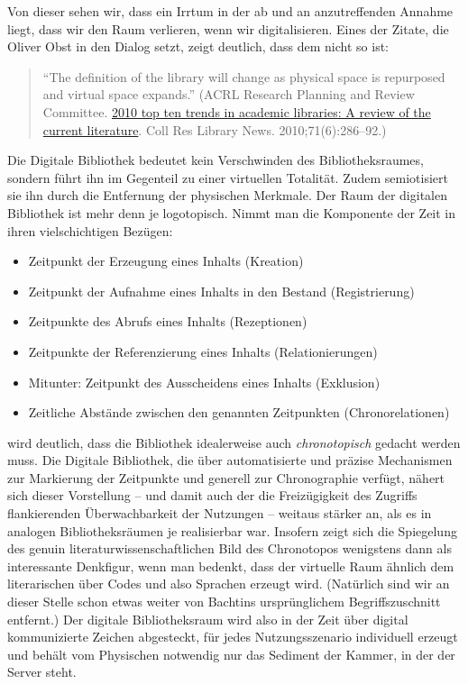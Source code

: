 \documentclass[output=paper]{langscibook}
\begin{document}
Von dieser sehen wir, dass ein Irrtum in der ab und an anzutreffenden
Annahme liegt, dass wir den Raum verlieren, wenn wir digitalisieren.
Eines der Zitate, die Oliver Obst in den Dialog setzt, zeigt deutlich,
dass dem nicht so ist:

\begin{quote}
\enquote{The definition of the library will change as physical space is
repurposed and virtual space expands.} (ACRL Research Planning and
Review Committee. \href{http://crln.acrl.org/content/71/6/286.full}{2010
top ten trends in academic libraries: A review of the current
literature}. Coll Res Library News. 2010;71(6):286--92.)
\end{quote}

\noindent Die Digitale Bibliothek bedeutet kein Verschwinden des
Bibliotheksraumes, sondern führt ihn im Gegenteil zu einer virtuellen
Totalität. Zudem semiotisiert sie ihn durch die Entfernung der
physischen Merkmale. Der Raum der digitalen Bibliothek ist mehr denn je
logotopisch. Nimmt man die Komponente der Zeit in ihren vielschichtigen
Bezügen:

\begin{itemize}
\item
  Zeitpunkt der Erzeugung eines Inhalts (Kreation)
\item
  Zeitpunkt der Aufnahme eines Inhalts in den Bestand (Registrierung)
\item
  Zeitpunkte des Abrufs eines Inhalts (Rezeptionen)
\item
  Zeitpunkte der Referenzierung eines Inhalts (Relationierungen)
\item
  Mitunter: Zeitpunkt des Ausscheidens eines Inhalts (Exklusion)
\item
  Zeitliche Abstände zwischen den genannten Zeitpunkten
  (Chronorelationen)
\end{itemize}

\noindent wird deutlich, dass die Bibliothek idealerweise auch
\emph{chronotopisch} gedacht werden muss. Die Digitale Bibliothek, die
über automatisierte und präzise Mechanismen zur Markierung der
Zeitpunkte und generell zur Chronographie verfügt, nähert sich dieser
Vorstellung -- und damit auch der die Freizügigkeit des Zugriffs
flankierenden Überwachbarkeit der Nutzungen -- weitaus stärker an, als
es in analogen Bibliotheksräumen je realisierbar war. Insofern zeigt
sich die Spiegelung des genuin literaturwissenschaftlichen Bild des
Chronotopos wenigstens dann als interessante Denkfigur, wenn man
bedenkt, dass der virtuelle Raum ähnlich dem literarischen über Codes
und also Sprachen erzeugt wird. (Natürlich sind wir an dieser Stelle
schon etwas weiter von Bachtins ursprünglichem Begriffszuschnitt
entfernt.) Der digitale Bibliotheksraum wird also in der Zeit über
digital kommunizierte Zeichen abgesteckt, für jedes Nutzungsszenario
individuell erzeugt und behält vom Physischen notwendig nur das Sediment
der Kammer, in der der Server steht.
\end{document}
